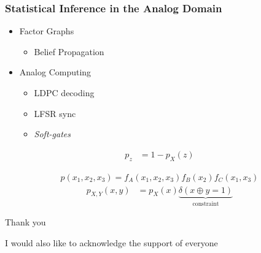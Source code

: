 \begin{frame}
\frametitle{Statistical Inference in the Analog Domain}
\begin{minipage}{0.4\columnwidth}
\begin{itemize}
\item Factor Graphs
\begin{itemize}
\item Belief Propagation
\end{itemize}
\vspace{1em}
\item Analog Computing
\begin{itemize}
\item LDPC decoding  
\item LFSR sync
\item \emph{Soft-gates}
\end{itemize}
\end{itemize}
\vspace{1em}
\scalebox{1}{ }
\small
\begin{align*}
p_{z}&=1-p_X(z)
\end{align*}
\end{minipage}
\hfill
\begin{minipage}{0.5\columnwidth}
\centering \scalebox{0.8}{ }
\small
\begin{align*}
p(x_1,x_2,x_3)=f_A(x_1,x_2,x_3) f_B(x_2)f_C(x_1,x_3)
\end{align*}
\scalebox{1}{ }
\small
\begin{align*}
p_{X,Y}(x,y)&=p_X(x)\underbrace{\delta(x\oplus y = 1)}_{\text{constraint}}
\end{align*}
\end{minipage}

\end{frame}

\begin{frame}

{\Huge{\centerline{Thank you}}}
\vspace{2em}
{\small I would also like to acknowledge the support of everyone}

\end{frame}




